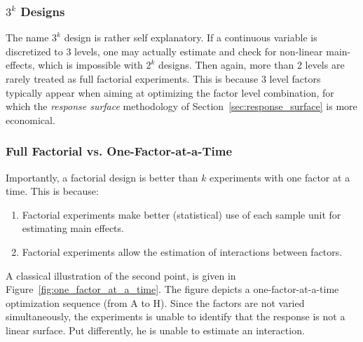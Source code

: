 \subsubsection{$3^k$ Designs}
The name $3^k$ design is rather self explanatory.
If a continuous variable is discretized to $3$ levels, one may actually estimate and check for non-linear main-effects, which is impossible with $2^k$ designs. 
Then again, more than $2$ levels are rarely treated as full factorial experiments. 
This is because $3$ level factors typically appear when aiming at optimizing the factor level combination, for which the \emph{response surface} methodology of Section~\ref{sec:response_surface} is more economical.



\subsubsection{Full Factorial vs. One-Factor-at-a-Time}
Importantly, a factorial design is better than $k$ experiments with one factor at a time. This is because:
\begin{enumerate}
\item Factorial experiments make better (statistical) use of each sample unit for estimating main effects.
\item Factorial experiments allow the estimation of interactions between factors. 
\end{enumerate}
A classical illustration of the second point, is given in Figure~\ref{fig:one_factor_at_a_time}.
The figure depicts a one-factor-at-a-time optimization sequence (from A to H). Since the factors are not varied simultaneously, the experiments is unable to identify that the response is not a linear surface. 
Put differently, he is unable to estimate an interaction.

